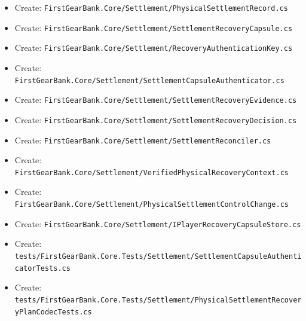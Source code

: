 \documentclass[
  10pt,
  letterpaper,
]{article}
\begin{document}
\begin{itemize}
\item
  Create:
  \texttt{FirstGearBank.}\allowbreak{}\texttt{Core/}\allowbreak{}\texttt{Settlement/}\allowbreak{}\texttt{PhysicalSettlementRecord.}\allowbreak{}\texttt{cs}
\item
  Create:
  \texttt{FirstGearBank.}\allowbreak{}\texttt{Core/}\allowbreak{}\texttt{Settlement/}\allowbreak{}\texttt{SettlementRecoveryCapsule.}\allowbreak{}\texttt{cs}
\item
  Create:
  \texttt{FirstGearBank.}\allowbreak{}\texttt{Core/}\allowbreak{}\texttt{Settlement/}\allowbreak{}\texttt{RecoveryAuthenticationKey.}\allowbreak{}\texttt{cs}
\item
  Create:
  \texttt{FirstGearBank.}\allowbreak{}\texttt{Core/}\allowbreak{}\texttt{Settlement/}\allowbreak{}\texttt{SettlementCapsuleAuthenticator.}\allowbreak{}\texttt{cs}
\item
  Create:
  \texttt{FirstGearBank.}\allowbreak{}\texttt{Core/}\allowbreak{}\texttt{Settlement/}\allowbreak{}\texttt{SettlementRecoveryEvidence.}\allowbreak{}\texttt{cs}
\item
  Create:
  \texttt{FirstGearBank.}\allowbreak{}\texttt{Core/}\allowbreak{}\texttt{Settlement/}\allowbreak{}\texttt{SettlementRecoveryDecision.}\allowbreak{}\texttt{cs}
\item
  Create:
  \texttt{FirstGearBank.}\allowbreak{}\texttt{Core/}\allowbreak{}\texttt{Settlement/}\allowbreak{}\texttt{SettlementReconciler.}\allowbreak{}\texttt{cs}
\item
  Create:
  \texttt{FirstGearBank.}\allowbreak{}\texttt{Core/}\allowbreak{}\texttt{Settlement/}\allowbreak{}\texttt{VerifiedPhysicalRecoveryContext.}\allowbreak{}\texttt{cs}
\item
  Create:
  \texttt{FirstGearBank.}\allowbreak{}\texttt{Core/}\allowbreak{}\texttt{Settlement/}\allowbreak{}\texttt{PhysicalSettlementControlChange.}\allowbreak{}\texttt{cs}
\item
  Create:
  \texttt{FirstGearBank.}\allowbreak{}\texttt{Core/}\allowbreak{}\texttt{Settlement/}\allowbreak{}\texttt{IPlayerRecoveryCapsuleStore.}\allowbreak{}\texttt{cs}
\item
  Create:
  \texttt{tests/}\allowbreak{}\texttt{FirstGearBank.}\allowbreak{}\texttt{Core.}\allowbreak{}\texttt{Tests/}\allowbreak{}\texttt{Settlement/}\allowbreak{}\texttt{SettlementCapsuleAuthenticatorTests.}\allowbreak{}\texttt{cs}
\item
  Create:
  \texttt{tests/}\allowbreak{}\texttt{FirstGearBank.}\allowbreak{}\texttt{Core.}\allowbreak{}\texttt{Tests/}\allowbreak{}\texttt{Settlement/}\allowbreak{}\texttt{PhysicalSettlementRecoveryPlanCodecTests.}\allowbreak{}\texttt{cs}

\end{itemize}
\end{document}
